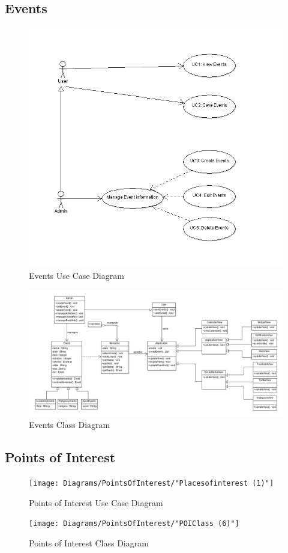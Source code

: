 \documentclass[11pt]{article}
\begin{document}
	\subsection{Events}
	\begin{figure}[!h]
        \centering
        \includegraphics[width=\textwidth]{Diagrams/Events/AzharEventsUseCaseDiagram}
        \caption{Events Use Case Diagram}
        \label{fig:events_use_case}
    \end{figure}
    \begin{figure}[!h]
        \centering
        \includegraphics[width=\textwidth]{Diagrams/Events/AzharEventsClassDiagram}
        \caption{Events Class Diagram}
        \label{fig:events_class}
    \end{figure}
	\subsection{Points of Interest}
	\begin{figure}[!h]
        \centering
        \texttt{[image: Diagrams/PointsOfInterest/"Placesofinterest (1)"]}
        \caption{Points of Interest Use Case Diagram}
        \label{fig:poi_use_case}
    \end{figure}
    \begin{figure}[!h]
        \centering
        \texttt{[image: Diagrams/PointsOfInterest/"POIClass (6)"]}
        \caption{Points of Interest Class Diagram}
        \label{fig:poi_class}
    \end{figure}
\end{document}
